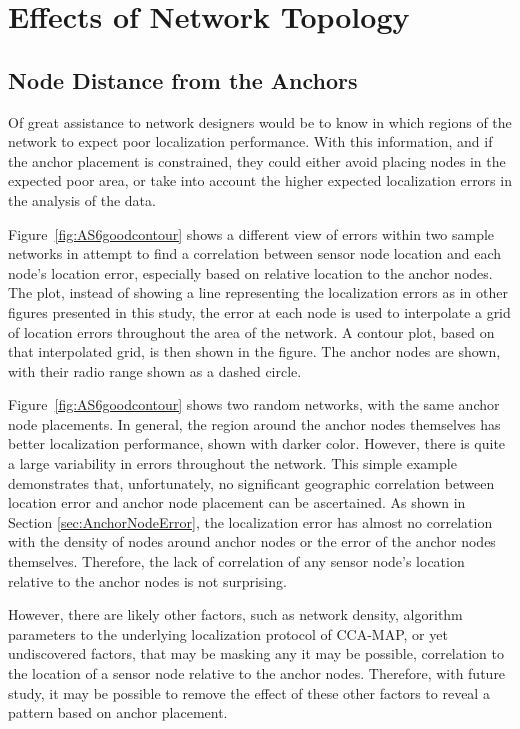 \chapter{Effects of Network Topology}

\section{Node Distance from the Anchors}

Of great assistance to network designers would be to know in which regions of the network to expect poor localization performance.  With this information, and if the anchor placement is constrained, they could either avoid placing nodes in the expected poor area, or take into account the higher expected localization errors in the analysis of the data.

Figure~\ref{fig:AS6goodcontour} shows a different view of errors within two sample networks in attempt to find a correlation between sensor node location and each node's location error, especially based on relative location to the anchor nodes.  The plot, instead of showing a line representing the localization errors as in other figures presented in this study, the error at each node is used to interpolate a grid of location errors throughout the area of the network.  A contour plot, based on that interpolated grid, is then shown in the figure.  The anchor nodes are shown, with their radio range shown as a dashed circle.  

Figure~\ref{fig:AS6goodcontour} shows two random networks, with the same anchor node placements. In general, the region around the anchor nodes themselves has better localization performance, shown with darker color.  However, there is quite a large variability in errors throughout the network.  This simple example demonstrates that, unfortunately, no significant geographic correlation between location error and anchor node placement can be ascertained.  As shown in Section \ref{sec:AnchorNodeError}, the localization error has almost no correlation with the density of nodes around anchor nodes or the error of the anchor nodes themselves.  Therefore, the lack of correlation of any sensor node's location relative to the anchor nodes is not surprising.

However, there are likely other factors, such as network density, algorithm parameters to the underlying localization protocol of CCA-MAP, or yet undiscovered factors, that may be masking any it may be possible, correlation to the location of a sensor node relative to the anchor nodes.  Therefore, with future study, it may be possible to remove the effect of these other factors to reveal a pattern based on anchor placement. 

